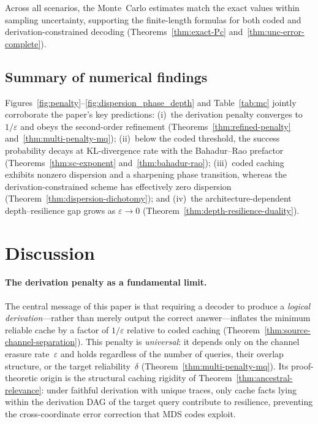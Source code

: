 \documentclass[journal]{IEEEtran}
\numberwithin{equation}{section}
\begin{document}
Across all scenarios, the Monte~Carlo estimates match the exact values within sampling uncertainty,
supporting the finite-length formulas for both coded and derivation-constrained decoding
(Theorems~\ref{thm:exact-Pc} and~\ref{thm:unc-error-complete}).

\subsection{Summary of numerical findings}
\label{subsec:exp-summary}

Figures~\ref{fig:penalty}--\ref{fig:dispersion_phase_depth} and Table~\ref{tab:mc} jointly corroborate the paper's
key predictions:
(i)~the derivation penalty converges to \(1/\varepsilon\) and obeys the second-order refinement
(Theorems~\ref{thm:refined-penalty} and~\ref{thm:multi-penalty-mq});
(ii)~below the coded threshold, the success probability decays at KL-divergence rate with the
Bahadur--Rao prefactor (Theorems~\ref{thm:sc-exponent} and~\ref{thm:bahadur-rao});
(iii)~coded caching exhibits nonzero dispersion and a sharpening phase transition, whereas the
derivation-constrained scheme has effectively zero dispersion (Theorem~\ref{thm:dispersion-dichotomy});
and (iv)~the architecture-dependent depth--resilience gap grows as \(\varepsilon\to 0\)
(Theorem~\ref{thm:depth-resilience-duality}).

\section{Discussion}
\label{sec:discussion}

\paragraph{The derivation penalty as a fundamental limit.}
The central message of this paper is that requiring a decoder to
produce a \emph{logical derivation}---rather than merely output
the correct answer---inflates the minimum reliable cache by a
factor of $1/\varepsilon$ relative to coded caching
(Theorem~\ref{thm:source-channel-separation}).
This penalty is \emph{universal}: it depends only on the channel
erasure rate~$\varepsilon$ and holds regardless of the number of
queries, their overlap structure, or the target
reliability~$\delta$
(Theorem~\ref{thm:multi-penalty-mq}).
Its proof-theoretic origin is the structural caching rigidity
of Theorem~\ref{thm:ancestral-relevance}: under faithful
derivation with unique traces, only cache facts lying within
the derivation DAG of the target query contribute to resilience,
preventing the cross-coordinate error correction that MDS codes
exploit.
\end{document}
